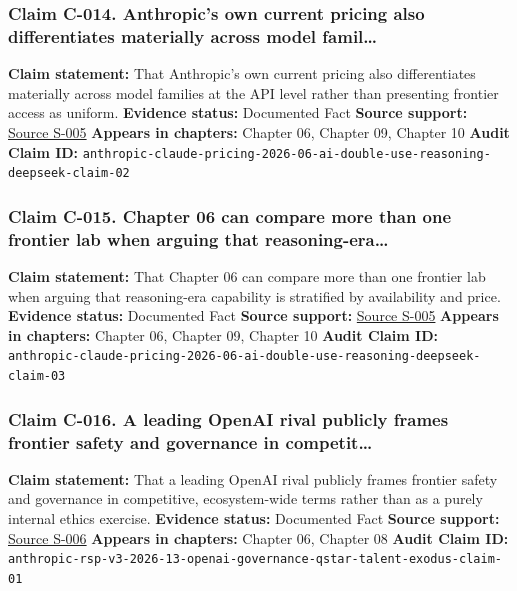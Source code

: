 \documentclass[
  american,
  11pt,
  letterpaper,
]{article}
\begin{document}
\subsubsection{Claim C-014. Anthropic's own current pricing also
differentiates materially across model
famil\ldots{}}\label{claim-c-014-anthropic-s-own-current-pricing-also-differentiates-materially-across-model-famil}

\textbf{Claim statement:} That Anthropic's own current pricing also
differentiates materially across model families at the API level rather
than presenting frontier access as uniform. \textbf{Evidence status:}
Documented Fact \textbf{Source support:}
\hyperref[source-s-005-plans-pricing-claude-by-anthropic]{Source S-005}
\textbf{Appears in chapters:} Chapter 06, Chapter 09, Chapter 10
\textbf{Audit Claim ID:}
\texttt{anthropic-claude-pricing-2026-06-ai-double-use-reasoning-deepseek-claim-02}

\subsubsection{Claim C-015. Chapter 06 can compare more than one
frontier lab when arguing that
reasoning-era\ldots{}}\label{claim-c-015-chapter-06-can-compare-more-than-one-frontier-lab-when-arguing-that-reasoning-era}

\textbf{Claim statement:} That Chapter 06 can compare more than one
frontier lab when arguing that reasoning-era capability is stratified by
availability and price. \textbf{Evidence status:} Documented Fact
\textbf{Source support:}
\hyperref[source-s-005-plans-pricing-claude-by-anthropic]{Source S-005}
\textbf{Appears in chapters:} Chapter 06, Chapter 09, Chapter 10
\textbf{Audit Claim ID:}
\texttt{anthropic-claude-pricing-2026-06-ai-double-use-reasoning-deepseek-claim-03}

\subsubsection{Claim C-016. A leading OpenAI rival publicly frames
frontier safety and governance in
competit\ldots{}}\label{claim-c-016-a-leading-openai-rival-publicly-frames-frontier-safety-and-governance-in-competit}

\textbf{Claim statement:} That a leading OpenAI rival publicly frames
frontier safety and governance in competitive, ecosystem-wide terms
rather than as a purely internal ethics exercise. \textbf{Evidence
status:} Documented Fact \textbf{Source support:}
\hyperref[source-s-006-anthropics-responsible-scaling-policy-version-30]{Source
S-006} \textbf{Appears in chapters:} Chapter 06, Chapter 08
\textbf{Audit Claim ID:}
\texttt{anthropic-rsp-v3-2026-13-openai-governance-qstar-talent-exodus-claim-01}
\end{document}
